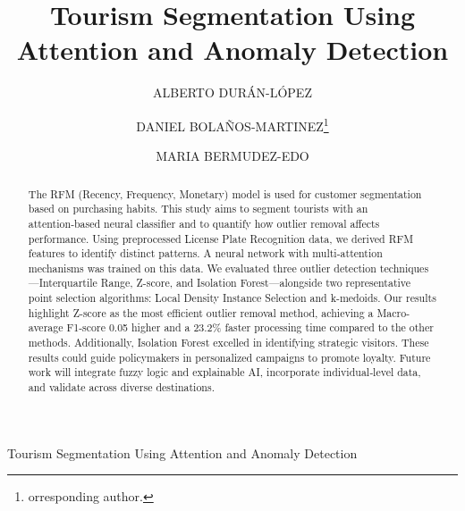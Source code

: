\documentclass{ws-ijitdm}
\begin{document}
{Tourism Segmentation Using Attention and Anomaly Detection}


\title{Tourism Segmentation Using Attention and Anomaly Detection}

\author{ALBERTO DURÁN-LÓPEZ}

\address{Research Center for Information and Communication \\ Technologies (CITIC-UGR), University of Granada, Granada, Spain. \\ albduranlopez@ugr.es}

\author{DANIEL BOLAÑOS-MARTINEZ\footnote{
orresponding author.}}

\address{Research Center for Information and Communication \\ Technologies (CITIC-UGR), University of Granada, Granada, Spain. \\ danibolanos@ugr.es}

\author{MARIA BERMUDEZ-EDO}

\address{Research Center for Information and Communication \\ Technologies (CITIC-UGR), University of Granada, Granada, Spain. \\ Andalusian Institute of Research and Innovation in Tourism (IATUR), 18011, Granada, Spain. \\ mbe@ugr.es}

\maketitle


\begin{abstract}
The RFM (Recency, Frequency, Monetary) model is used for customer segmentation based on purchasing habits. {\color{black}This study aims to segment tourists with an attention‑based neural classifier and to quantify how outlier removal affects performance.} Using preprocessed License Plate Recognition data, we derived RFM features to identify distinct patterns. A neural network with multi-attention mechanisms was trained on this data. We evaluated three outlier detection techniques—Interquartile Range, Z-score, and Isolation Forest—alongside two representative point selection algorithms: Local Density Instance Selection and k-medoids. Our results highlight Z-score as the most efficient outlier removal method, achieving a Macro-average F1-score 0.05 higher and a 23.2\% faster processing time compared to the other methods. Additionally, Isolation Forest excelled in identifying strategic visitors. {\color{black}These results could guide policymakers in personalized campaigns to promote loyalty. Future work will integrate fuzzy logic and explainable AI, incorporate individual‑level data, and validate across diverse destinations.}

\end{abstract}
\end{document}
